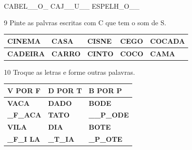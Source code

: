 CABEL\_\_O\_ CAJ\_\_U\_\_ ESPELH\_O\_\_


\num{9} Pinte as palvras escritas com C que tem o som de S.


\begin{longtable}[]{@{}lllll@{}}
\toprule
\textbf{CINEMA} & \textbf{CASA} & \textbf{CISNE} & \textbf{CEGO} &
\textbf{COCADA}\tabularnewline
\midrule
\endhead
\textbf{CADEIRA} & \textbf{CARRO} & \textbf{CINTO } & \textbf{COCO} &
\textbf{CAMA}\tabularnewline
\bottomrule
\end{longtable}

\num{10} Troque as letras e forme outras palavras.


\begin{longtable}[]{@{}lll@{}}
\toprule
\textbf{V POR F} & \textbf{D POR T} & \textbf{B POR P}\tabularnewline
\midrule
\endhead
\textbf{VACA} & \textbf{DADO} & \textbf{BODE}\tabularnewline
\textbf{\_F\_ACA} & \textbf{TATO} & \textbf{\_\_P\_ODE}\tabularnewline
\textbf{VILA} & \textbf{DIA} & \textbf{BOTE}\tabularnewline
\textbf{\_F\_I LA} & \textbf{\_T\_IA} & \textbf{\_P\_OTE}\tabularnewline
\bottomrule
\end{longtable}

